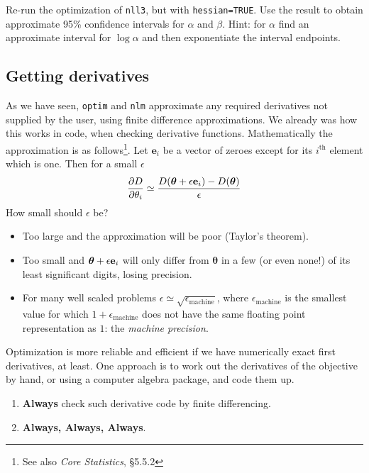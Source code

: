 \documentclass[10pt] {article}
\newcommand{\pdif}[2]{\frac{\partial #1}{\partial #2}}
\theoremstyle{definition}
\begin{document}
\bigskip

 Re-run the optimization of {\tt nll3}, but with \lstinline+hessian=TRUE+. Use the result to obtain approximate 95\% confidence intervals for $\alpha$ and $\beta$. Hint: for $\alpha$ find an approximate interval for $\log \alpha$ and then exponentiate the interval endpoints.  

\subsection{Getting derivatives \label{sec:deriv}}

As we have seen, {\tt optim} and {\tt nlm} approximate any required derivatives not supplied by the user, using finite difference approximations. We already was how this works in code, when checking derivative functions. Mathematically the approximation is as follows\footnote{See also {\em Core Statistics}, \S5.5.2}. Let ${\bm e}_i$ be a vector of zeroes except for its $i^\text{th}$ element which is one. Then for a small $\epsilon$
$$
\pdif{D}{\theta_i} \simeq \frac{D({\bm \theta} + \epsilon {\bf e}_i) - D({\bm \theta})}{\epsilon}
$$ 
How small should $\epsilon$ be?
\begin{itemize}
\item Too large and the approximation will be poor (Taylor's theorem).
\item Too small and ${\bm \theta} + \epsilon {\bf e}_i$ will only differ from ${\bm \theta}$ in a few (or even none!) of its least significant digits, losing precision.
\item For many well scaled problems $\epsilon \simeq \sqrt{\epsilon_{\text{machine}}}$, where $\epsilon_{\text{machine}}$ is the smallest value for which $1 + \epsilon_{\text{machine}}$ does not have the same floating point representation as $1$: the {\em  machine precision}.
\end{itemize}

Optimization is more reliable and efficient if we have numerically exact first derivatives, at least. One approach is  to work out the derivatives of the objective by hand, or using a computer algebra package, and code them up. 
\begin{enumerate}
\item {\bf Always} check such derivative code by finite differencing.
\item {\bf Always, Always, Always}.
\end{enumerate}
\end{document}
